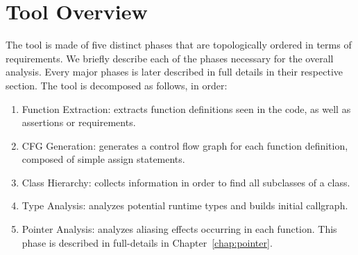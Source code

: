 \chapter{Tool Overview}
\label{chap:overview}
The tool is made of five distinct phases that are topologically ordered in terms
of requirements. We briefly describe each of the phases necessary for the
overall analysis. Every major phases is later described in full details in
their respective section.
The tool is decomposed as follows, in order:
\begin{enumerate}
    \item{Function Extraction}: extracts function definitions seen in the code, as well as
    assertions or requirements.

    \item{CFG Generation}: generates a control flow graph for each function
    definition, composed of simple assign statements.

    \item{Class Hierarchy}: collects information in order to find all subclasses of a class.

    \item{Type Analysis}: analyzes potential runtime types and builds initial callgraph.

    \item{Pointer Analysis}: analyzes aliasing effects occurring in each
    function. This phase is described in full-details in
    Chapter~\ref{chap:pointer}.
\end{enumerate}

